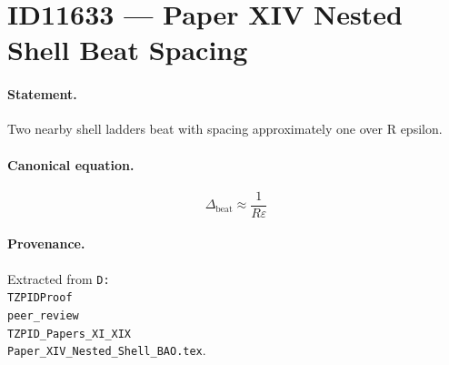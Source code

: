 \section*{ID11633 --- Paper XIV Nested Shell Beat Spacing}

\paragraph{Statement.}
Two nearby shell ladders beat with spacing approximately one over R epsilon.

\paragraph{Canonical equation.}
\[
\Delta_{\mathrm{beat}}\approx\frac{1}{R\varepsilon}
\]

\paragraph{Provenance.}
Extracted from \texttt{D:\\TZPIDProof\\peer\_review\\TZPID\_Papers\_XI\_XIX\\Paper\_XIV\_Nested\_Shell\_BAO.tex}.
